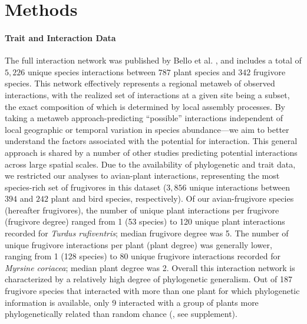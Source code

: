 \documentclass[num-refs]{article}%
\begin{document}
\section*{Methods}

\paragraph{Trait and Interaction Data}
The full interaction network was published by Bello et al. \citep{bello2017}, and includes a total of $5,226$ unique species interactions between $787$ plant species and $342$ frugivore species. This network effectively represents a regional metaweb of observed interactions, with the realized set of interactions at a given site being a subset, the exact composition of which is determined by local assembly processes. By taking a metaweb approach-predicting “possible” interactions independent of local geographic or temporal variation in species abundance—we aim to better understand the factors associated with the potential for interaction. This general approach is shared by a number of other studies predicting potential interactions across large spatial scales. \citep{strydom2022food, dansereau2024spatially, hao2025global} Due to the availability of phylogenetic and trait data, we restricted our analyses to avian-plant interactions, representing the most species-rich set of frugivores in this dataset ($3,856$ unique interactions between $394$ and $242$ plant and bird species, respectively). Of our avian-frugivore species (hereafter frugivores), the number of unique plant interactions per frugivore (frugivore degree) ranged from 1 (53 species) to 120 unique plant interactions recorded for \emph{Turdus rufiventris}; median frugivore degree was 5. The number of unique frugivore interactions per plant (plant degree) was generally lower, ranging from 1 (128 species) to 80 unique frugivore interactions recorded for \emph{Myrsine coriacea}; median plant degree was 2. Overall this interaction network is characterized by a relatively high degree of phylogenetic generalism. Out of 187 frugivore species that interacted with more than one plant for which phylogenetic information is available, only 9 interacted with a group of plants more phylogenetically related than random chance (\citep{kembel2010picante}, see supplement). 
\end{document}
